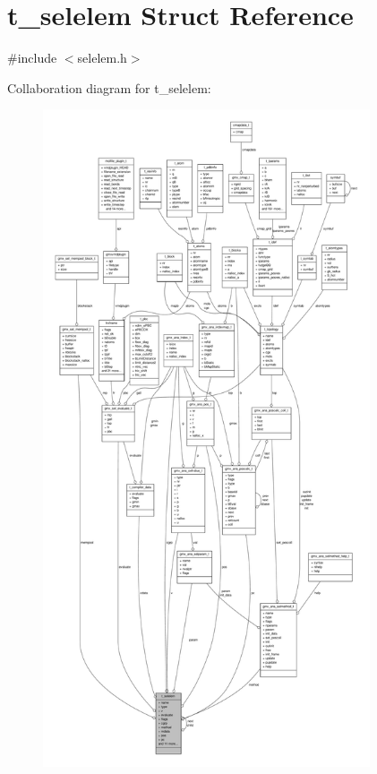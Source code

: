 \hypertarget{structt__selelem}{\section{t\-\_\-selelem \-Struct \-Reference}
\label{structt__selelem}
}


{\ttfamily \#include $<$selelem.\-h$>$}



\-Collaboration diagram for t\-\_\-selelem\-:
\nopagebreak
\begin{figure}[H]
\begin{center}
\leavevmode
\includegraphics[height=550pt]{structt__selelem__coll__graph}
\end{center}
\end{figure}
